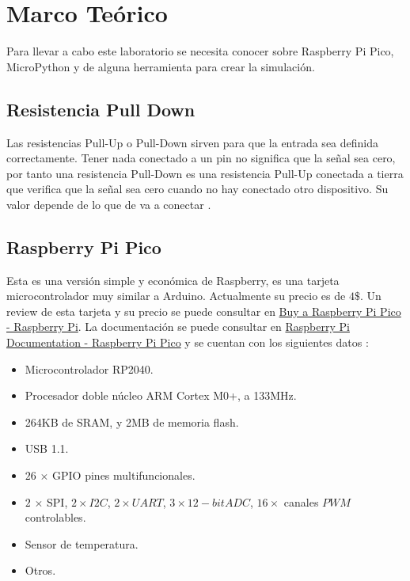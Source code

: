 \documentclass{article}
\begin{document}
    \section{Marco Teórico}\label{sec:marco-teórico}


    Para llevar a cabo este laboratorio se necesita conocer sobre Raspberry Pi Pico, MicroPython y de alguna herramienta para crear la simulación.

    \subsection{Resistencia Pull Down}

    Las resistencias Pull-Up o Pull-Down sirven para que la entrada sea definida correctamente. Tener nada conectado a un pin no significa que la señal sea cero, por tanto una resistencia Pull-Down es una resistencia Pull-Up conectada a tierra que verifica que la señal sea cero cuando no hay conectado otro dispositivo. Su valor depende de lo que de va a conectar \cite{arduino-2018}.

    \subsection{Raspberry Pi Pico}

    Esta es una versión simple y económica de Raspberry, es una tarjeta microcontrolador muy similar a Arduino. Actualmente su precio es de $4\$$. Un review de esta tarjeta y su precio se puede consultar en \href{https://www.raspberrypi.com/products/raspberry-pi-pico}{Buy a Raspberry Pi Pico - Raspberry Pi}. La documentación se puede consultar en \href{https://www.raspberrypi.com/documentation/microcontrollers/raspberry-pi-pico.html}{Raspberry Pi Documentation - Raspberry Pi Pico} y se cuentan con los siguientes datos \cite{raspberry-pi-ltd-2022}:

    \begin{itemize}
        \item Microcontrolador RP2040.
        \item Procesador doble núcleo ARM Cortex M0+, a 133MHz.
        \item 264KB de SRAM, y 2MB de memoria flash.
        \item USB 1.1.
        \item $26$ $\times$ GPIO pines multifuncionales.
        \item $2$ $\times$ SPI, $2 \times I2C$, $2 \times UART$, $3 \times 12-bit ADC$, $16 \times $ canales $PWM$ controlables.
        \item Sensor de temperatura.
        \item Otros.
    \end{itemize}
\end{document}
